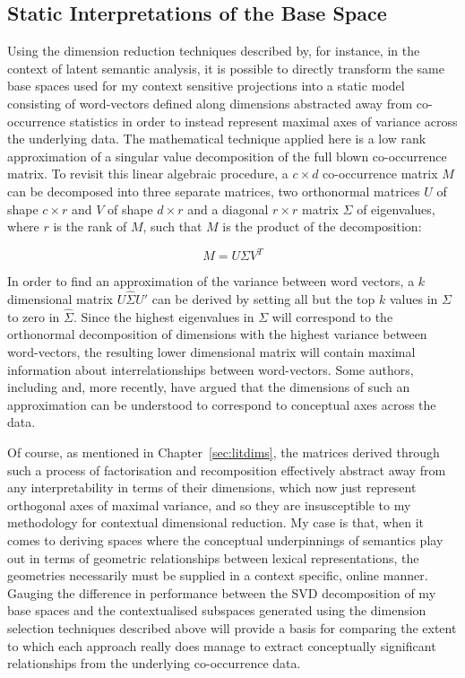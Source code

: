 \subsection{Static Interpretations of the Base Space}
Using the dimension reduction techniques described by, for instance, \cite{DeerwesterEA1990} in the context of latent semantic analysis, it is possible to directly transform the same base spaces used for my context sensitive projections into a static model consisting of word-vectors defined along dimensions abstracted away from co-occurrence statistics in order to instead represent maximal axes of variance across the underlying data.  The mathematical technique applied here is a low rank approximation of a singular value decomposition of the full blown co-occurrence matrix.  To revisit this linear algebraic procedure, a $c \times d$ co-occurrence matrix $M$ can be decomposed into three separate matrices, two orthonormal matrices $U$ of shape $c \times r$ and $V$ of shape $d \times r$ and a diagonal $r \times r$ matrix $\Sigma$ of eigenvalues, where $r$ is the rank of $M$, such that $M$ is the product of the decomposition:

\begin{equation}
M = U \Sigma V^{T}
\end{equation}

\noindent In order to find an approximation of the variance between word vectors, a $k$ dimensional matrix $U\hat{\Sigma}U'$ can be derived by setting all but the top $k$ values in $\Sigma$ to zero in $\hat{\Sigma}$.  Since the highest eigenvalues in $\Sigma$ will correspond to the orthonormal decomposition of dimensions with the highest variance between word-vectors, the resulting lower dimensional matrix will contain maximal information about interrelationships between word-vectors.  Some authors, including \citeauthor{DeerwesterEA1990} and, more recently, \cite{TurneyEA2010} have argued that the dimensions of such an approximation can be understood to correspond to conceptual axes across the data.

Of course, as mentioned in Chapter~\ref{sec:litdims}, the matrices derived through such a process of factorisation and recomposition effectively abstract away from any interpretability in terms of their dimensions, which now just represent orthogonal axes of maximal variance, and so they are insusceptible to my methodology for contextual dimensional reduction.  My case is that, when it comes to deriving spaces where the conceptual underpinnings of semantics play out in terms of geometric relationships between lexical representations, the geometries necessarily must be supplied in a context specific, online manner.  Gauging the difference in performance between the SVD decomposition of my base spaces and the contextualised subspaces generated using the dimension selection techniques described above will provide a basis for comparing the extent to which each approach really does manage to extract conceptually significant relationships from the underlying co-occurrence data.

